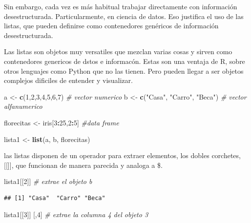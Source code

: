 \documentclass[
]{book}
\newenvironment{Shaded}{\begin{snugshade}}{\end{snugshade}}
\newcommand{\CommentTok}[1]{\textcolor[rgb]{0.56,0.35,0.01}{\textit{#1}}}
\newcommand{\DecValTok}[1]{\textcolor[rgb]{0.00,0.00,0.81}{#1}}
\newcommand{\KeywordTok}[1]{\textcolor[rgb]{0.13,0.29,0.53}{\textbf{#1}}}
\newcommand{\NormalTok}[1]{#1}
\newcommand{\OperatorTok}[1]{\textcolor[rgb]{0.81,0.36,0.00}{\textbf{#1}}}
\newcommand{\StringTok}[1]{\textcolor[rgb]{0.31,0.60,0.02}{#1}}
\begin{document}
Sin embargo, cada vez es más habitual trabajar directamente con información desestructurada. Particularmente, en ciencia de datos. Eso justifica el uso de las listas, que pueden definirse como contenedores genéricos de información desestructurada.

Las listas son objetos muy versatiles que mezclan varias cosas y sirven como contenedores genericos de dstos e informacón. Estas son una ventaja de R, sobre otros lenguajes como Python que no las tienen. Pero pueden llegar a ser objetos complejos dificiles de entender y visualizar.

\begin{Shaded}
\begin{Highlighting}[]
\NormalTok{a <-}\StringTok{ }\KeywordTok{c}\NormalTok{(}\DecValTok{1}\NormalTok{,}\DecValTok{2}\NormalTok{,}\DecValTok{3}\NormalTok{,}\DecValTok{4}\NormalTok{,}\DecValTok{5}\NormalTok{,}\DecValTok{6}\NormalTok{,}\DecValTok{7}\NormalTok{) }\CommentTok{# vector numerico}
\NormalTok{b <-}\StringTok{ }\KeywordTok{c}\NormalTok{(}\StringTok{"Casa"}\NormalTok{, }\StringTok{"Carro"}\NormalTok{, }\StringTok{"Beca"}\NormalTok{) }\CommentTok{# vector alfanumerico}

\NormalTok{florecitas <-}\StringTok{ }\NormalTok{iris[}\DecValTok{3}\OperatorTok{:}\DecValTok{25}\NormalTok{,}\DecValTok{2}\OperatorTok{:}\DecValTok{5}\NormalTok{] }\CommentTok{#data frame}

\NormalTok{lista1 <-}\StringTok{ }\KeywordTok{list}\NormalTok{(a, b, florecitas)}
\end{Highlighting}
\end{Shaded}

las listas disponen de un operador para extraer elementos, los dobles corchetes, {[}{[}{]}{]}, que funcionan de manera parecida y analoga a \$.

\begin{Shaded}
\begin{Highlighting}[]
\NormalTok{lista1[[}\DecValTok{2}\NormalTok{]] }\CommentTok{# extrae el objeto b}
\end{Highlighting}
\end{Shaded}

\begin{verbatim}
## [1] "Casa"  "Carro" "Beca"
\end{verbatim}

\begin{Shaded}
\begin{Highlighting}[]
\NormalTok{lista1[[}\DecValTok{3}\NormalTok{]] [,}\DecValTok{4}\NormalTok{] }\CommentTok{# extrae la columna 4 del objeto 3}
\end{Highlighting}
\end{Shaded}
\end{document}
